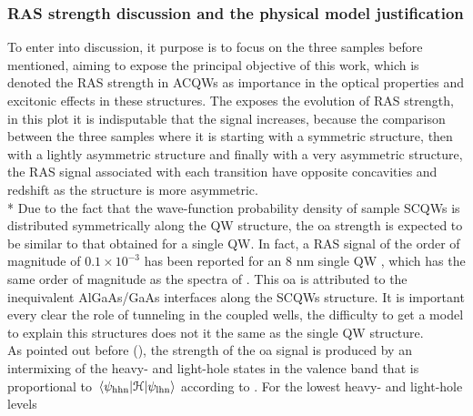 \subsubsection{RAS strength discussion and the physical model justification}
\label{subsubsec:chapter-3-ras-discussed}
\vspace{-10mm}
To enter into discussion, it purpose is to focus on the three samples before mentioned, aiming to expose the principal objective of this work, which is denoted the \gls{RAS} strength in \gls{ACQWs} as importance in the  optical properties and excitonic effects in these structures. The  exposes the evolution of \gls{RAS} strength, in this plot it is indisputable that the signal increases, because the comparison between the three samples where it is starting with a symmetric structure, then with a lightly asymmetric structure and finally with a very asymmetric structure, the \gls{RAS} signal associated with each transition have opposite concavities and redshift as the structure is more asymmetric. \\*
Due to the fact that the wave-function probability density of sample \gls{SCQWs} is distributed symmetrically along the QW
structure, the \gls{oa} strength is expected to be similar to that
obtained for a single \gls{QW}. In fact, a \gls{RAS} signal of the order of magnitude of $0.1\times 10^{-3}$ has been reported for an 8 nm single \gls{QW} \cite{chen2002interface}, which has the same order of magnitude as the spectra of . This \gls{oa} is attributed to the inequivalent AlGaAs/GaAs interfaces along the \gls{SCQWs}
structure. It is important every clear the role of tunneling in the coupled wells, the difficulty to get a model to explain this structures  does not it the same as the single QW structure.  \\
As pointed out before (), the strength of the \gls{oa} signal is produced by an intermixing of the heavy- and light-hole states in the valence band that is proportional to  $\mel{\psi_{\mathrm{hhn}}}{\cal{H}}{\psi_{\mathrm{lhn}}}$ according to . For the lowest heavy- and light-hole levels
